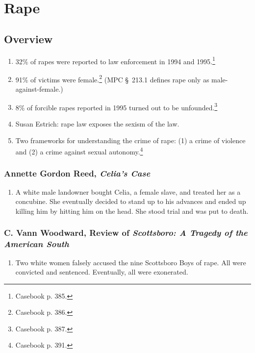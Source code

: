 \section{Rape}

\subsection{Overview}

\begin{enumerate}
    \item 32\% of rapes were reported to law enforcement in 1994 and 
    1995.\footnote{Casebook p. 385.}
    \item 91\% of victims were female.\footnote{Casebook p. 386.} (MPC \S\ 213.1 
    defines rape only as male-against-female.)
    \item 8\% of forcible rapes reported in 1995 turned out to be 
    unfounded.\footnote{Casebook p. 387.}
    \item Susan Estrich: rape law exposes the sexism of the law.
    \item Two frameworks for understanding the crime of rape: (1) a crime of 
    violence and (2) a crime against sexual autonomy.\footnote{Casebook p. 
    391.}
\end{enumerate}

\subsubsection{Annette Gordon Reed, \emph{Celia's Case}}

\begin{enumerate}
    \item A white male landowner bought Celia, a female slave, and treated her 
    as a concubine. She eventually decided to stand up to his advances and 
    ended up killing him by hitting him on the head. She stood trial and was 
    put to death.
\end{enumerate}

\subsubsection{C. Vann Woodward, Review of \emph{Scottsboro: A Tragedy of the 
American South}}

\begin{enumerate}
    \item Two white women falsely accused the nine Scottsboro Boys of rape. 
    All were convicted and sentenced. Eventually, all were exonerated.
\end{enumerate}

